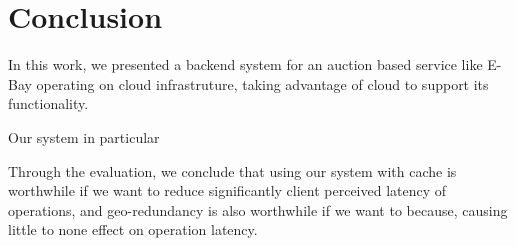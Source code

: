 \documentclass[runningheads]{llncs}
\begin{document}
\section{Conclusion}

In this work, we presented a backend system for an auction based service like E-Bay operating on cloud infrastruture, taking advantage of cloud  to support its functionality. 

Our system in particular 

Through the evaluation, we conclude that using our system with cache is worthwhile if we want to reduce significantly client perceived latency of operations, and geo-redundancy is also worthwhile if we want to because, causing little to none effect on operation latency. 


\end{document}
